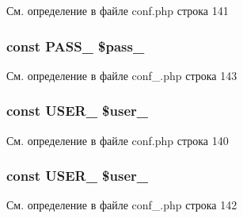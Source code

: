 См. определение в файле conf.\-php строка 141

\hypertarget{group___d_b__3_gad7bf3ef090d7da2ae80f4a5f3ab4e67c}{
\subsubsection[{P\-A\-S\-S\-\_\-3}]{\setlength{\rightskip}{0pt plus 5cm}const P\-A\-S\-S\-\_ \$pass\-\_}}\label{group___d_b__3_gad7bf3ef090d7da2ae80f4a5f3ab4e67c}


См. определение в файле conf\-\_\-.\-php строка 143

\hypertarget{group___d_b__3_gabb4d4077f995367d73794dcfd8c50a23}{
\subsubsection[{U\-S\-E\-R\-\_\-3}]{\setlength{\rightskip}{0pt plus 5cm}const U\-S\-E\-R\-\_ \$user\-\_}}\label{group___d_b__3_gabb4d4077f995367d73794dcfd8c50a23}


См. определение в файле conf.\-php строка 140

\hypertarget{group___d_b__3_gabb4d4077f995367d73794dcfd8c50a23}{
\subsubsection[{U\-S\-E\-R\-\_\-3}]{\setlength{\rightskip}{0pt plus 5cm}const U\-S\-E\-R\-\_ \$user\-\_}}\label{group___d_b__3_gabb4d4077f995367d73794dcfd8c50a23}


См. определение в файле conf\-\_\-.\-php строка 142

